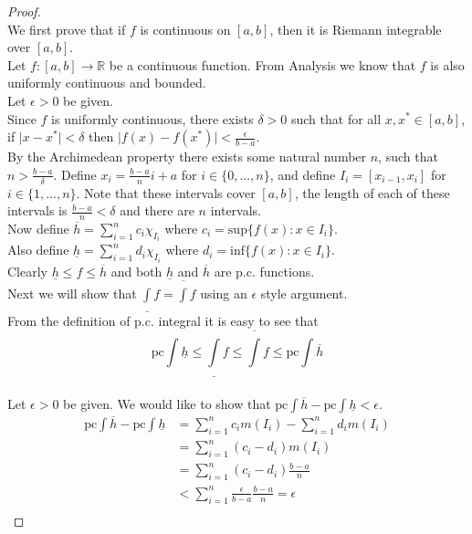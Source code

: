 \documentclass[12pt]{article}
\begin{document}
	\begin{proof}  \text{ }\\
		We first prove that if $f$ is continuous on $[a,b]$, then it is Riemann integrable over $[a,b]$. \\
		
		Let $f : [a,b] \to \mathbb{R}$ be a continuous function. From Analysis we know that $f$ is also uniformly continuous and bounded.\\
		Let $\epsilon > 0$ be given. \\
		Since $f$ is uniformly continuous, there exists $ \delta >0$ such that for all $x,x^* \in [a,b]$, if $\vert x - x^* \vert < \delta$ then $\vert f(x) - f(x^*) \vert < \frac{\epsilon}{b-a}$.\\
		By the Archimedean property there exists some natural number $n$, such that $n > \frac{b-a}{\delta}$. Define $x_i = \frac{b-a}{n} i+ a$ for $i \in \{0,...,n\}$, and define $I_i = [x_{i-1}, x_i]$ for $i \in \{1,...,n\}$. Note that these intervals cover $[a,b]$, the length of each of these intervals is $\frac{b-a}{n} < \delta$ and there are $n$ intervals. \\
		Now define $\overline{h} = \sum\limits_{i=1}^n c_i \chi_{I_i}$ where $c_i = \text{sup} \{f(x) : x \in I_i\}$. \\
		Also define $\underline{h} = \sum\limits_{i=1}^n d_i \chi_{I_i}$ where $d_i = \text{inf} \{f(x) : x \in I_i\}$. \\
		Clearly $\underline{h} \leq f \leq \overline{h}$ and both $\underline{h}$ and $\overline{h}$ are p.c. functions.\\
		
		Next we will show that $\underline{\int}f = \overline{\int}f$ using an $\epsilon$ style argument. \\
		
		From the definition of p.c. integral it is easy to see that $$\text{pc}\int\underline{h} \leq \underline{\int}f \leq \overline{\int}f \leq \text{pc}\int \overline{h}$$ \\
		Let $\epsilon > 0$ be given. We would like to show that $\text{pc}\int\overline{h} - \text{pc}\int \underline{h} < \epsilon$.\\
		\begin{align*}
			\text{pc}\int\overline{h} - \text{pc}\int\underline{h} & = \sum\limits_{i=1}^n c_i m(I_i) - \sum\limits_{i=1}^n d_i m(I_i) \\
			& = \sum\limits_{i=1}^n (c_i - d_i) m(I_i)\\
			& = \sum\limits_{i=1}^n (c_i - d_i) \frac{b-a}{n}\\
			& < \sum\limits_{i=1}^n \frac{\epsilon}{b-a} \frac{b-a}{n} = \epsilon\\
		\end{align*}
		

\end{proof}
\end{document}
